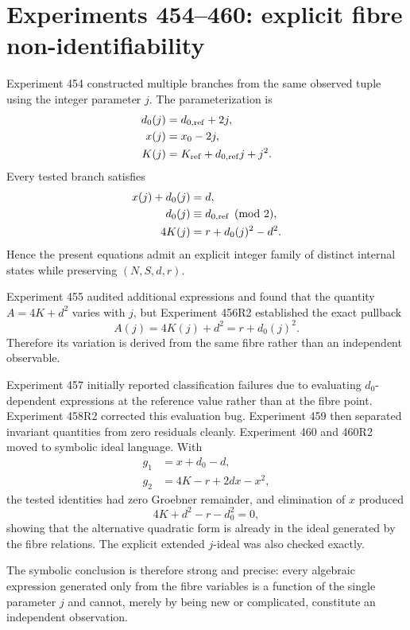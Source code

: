 \documentclass[11pt,a4paper]{article}
\begin{document}
\section{Experiments 454--460: explicit fibre non-identifiability}

Experiment 454 constructed multiple branches from the same observed tuple using the integer parameter $j$. The parameterization is
\begin{align}
d_0(j)&=d_{0,\rm ref}+2j,\\
x(j)&=x_0-2j,\\
K(j)&=K_{\rm ref}+d_{0,\rm ref}j+j^2.
\end{align}
Every tested branch satisfies
\begin{align}
x(j)+d_0(j)&=d,\\
d_0(j)&\equiv d_{0,\rm ref}\pmod 2,\\
4K(j)&=r+d_0(j)^2-d^2.
\end{align}
Hence the present equations admit an explicit integer family of distinct internal states while preserving $(N,S,d,r)$.

Experiment 455 audited additional expressions and found that the quantity $A=4K+d^2$ varies with $j$, but Experiment 456R2 established the exact pullback
\begin{equation}
A(j)=4K(j)+d^2=r+d_0(j)^2.
\end{equation}
Therefore its variation is derived from the same fibre rather than an independent observable.

Experiment 457 initially reported classification failures due to evaluating $d_0$-dependent expressions at the reference value rather than at the fibre point. Experiment 458R2 corrected this evaluation bug. Experiment 459 then separated invariant quantities from zero residuals cleanly. Experiment 460 and 460R2 moved to symbolic ideal language. With
\begin{align}
g_1&=x+d_0-d,\\
g_2&=4K-r+2dx-x^2,
\end{align}
the tested identities had zero Groebner remainder, and elimination of $x$ produced
\begin{equation}
4K+d^2-r-d_0^2=0,
\end{equation}
showing that the alternative quadratic form is already in the ideal generated by the fibre relations. The explicit extended $j$-ideal was also checked exactly.

The symbolic conclusion is therefore strong and precise: every algebraic expression generated only from the fibre variables is a function of the single parameter $j$ and cannot, merely by being new or complicated, constitute an independent observation.
\end{document}
